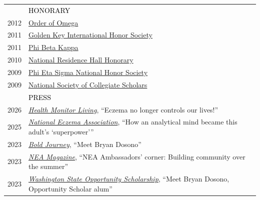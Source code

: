 \documentclass[12pt]{article}
\begin{document}
{\begin{longtable}{R{0.75in}p{5.0in}}
& \large \textcolor{black}{\uppercase{Honorary}}\\

\footnotesize{2012} & \href{https://orderofomega.org/}{Order of Omega}\\

\footnotesize{2011} & \href{https://www.goldenkey.org/}{Golden Key International Honor Society}\\

\footnotesize{2011} & \href{https://web.archive.org/web/20250821074323/https://depts.washington.edu/uwpbk/downloads/pbk_invitees_2011.pdf}{Phi Beta Kappa}\\

\footnotesize{2010} & \href{https://students.washington.edu/nrhh/Relevant/Active\%20Members.html}{National Residence Hall Honorary}\\

\footnotesize{2009} & \href{https://www.phietasigma.org/}{Phi Eta Sigma National Honor Society}\\

\footnotesize{2009} & \href{https://nscs.org/}{National Society of Collegiate Scholars} \medskip \\ 

& \large \textcolor{black}{\uppercase{Press}}\\

\footnotesize{2026} & \href{https://hipaa-submit.jotform.com/253496242654160}{\textit{Health Monitor Living}}, ``Eczema no longer controls our lives!''\\

\footnotesize{2025} & \href{https://nationaleczema.org/blog/how-an-analytical-mind-became-one-adults-superpower/}{\textit{National Eczema Association}}, ``How an analytical mind became this adult’s `superpower'''\\

\footnotesize{2023} & \href{https://boldjourney.com/news/meet-bryan-dosono/}{\textit{Bold Journey}}, ``Meet Bryan Dosono''\\

\footnotesize{2023} & \href{https://nationaleczema.org/wp-content/uploads/2023/10/NEA_Magazine_Fall2023_D01_Web.pdf}{\textit{NEA Magazine}}, ``NEA Ambassadors' corner: Building community over the summer''\\

\footnotesize{2023} & \href{https://waopportunityscholarship.org/get-involved/news/meet-bryan-dosono-opportunity-scholar-alum/}{\textit{Washington State Opportunity Scholarship}}, ``Meet Bryan Dosono, Opportunity Scholar alum''\\


\end{longtable}}
\end{document}
